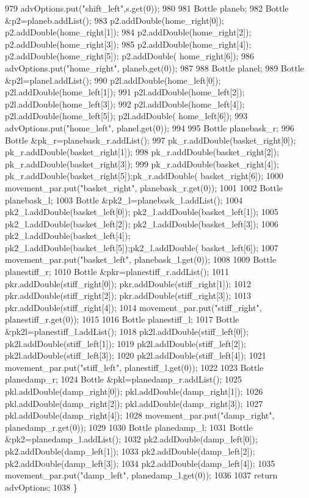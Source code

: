 \begin{DoxyCode}
979     advOptions.put(\textcolor{stringliteral}{"shift\_left"},s.get(0));
980 
981     Bottle planeb;
982     Bottle &p2=planeb.addList();
983     p2.addDouble(home_right[0]); p2.addDouble(home_right[1]);
984     p2.addDouble(home_right[2]); p2.addDouble(home_right[3]);
985     p2.addDouble(home_right[4]); p2.addDouble(home_right[5]); p2.addDouble(
      home_right[6]);
986     advOptions.put(\textcolor{stringliteral}{"home\_right"}, planeb.get(0));
987 
988     Bottle planel;
989     Bottle &p2l=planel.addList();
990     p2l.addDouble(home_left[0]); p2l.addDouble(home_left[1]);
991     p2l.addDouble(home_left[2]); p2l.addDouble(home_left[3]);
992     p2l.addDouble(home_left[4]); p2l.addDouble(home_left[5]); p2l.addDouble(
      home_left[6]);
993     advOptions.put(\textcolor{stringliteral}{"home\_left"}, planel.get(0));
994 
995     Bottle planebask\_r;
996     Bottle &pk\_r=planebask\_r.addList();
997     pk\_r.addDouble(basket_right[0]); pk\_r.addDouble(basket_right[1]);
998     pk\_r.addDouble(basket_right[2]); pk\_r.addDouble(basket_right[3]);
999     pk\_r.addDouble(basket_right[4]); pk\_r.addDouble(basket_right[5]);pk\_r.addDouble(
      basket_right[6]);
1000     movement_par.put(\textcolor{stringliteral}{"basket\_right"}, planebask\_r.get(0));
1001 
1002     Bottle planebask\_l;
1003     Bottle &pk2\_l=planebask\_l.addList();
1004     pk2\_l.addDouble(basket_left[0]); pk2\_l.addDouble(basket_left[1]);
1005     pk2\_l.addDouble(basket_left[2]); pk2\_l.addDouble(basket_left[3]);
1006     pk2\_l.addDouble(basket_left[4]); pk2\_l.addDouble(basket_left[5]);pk2\_l.addDouble(
      basket_left[6]);
1007     movement_par.put(\textcolor{stringliteral}{"basket\_left"}, planebask\_l.get(0));
1008 
1009     Bottle planestiff\_r;
1010     Bottle &pkr=planestiff\_r.addList();
1011     pkr.addDouble(stiff_right[0]); pkr.addDouble(stiff_right[1]);
1012     pkr.addDouble(stiff_right[2]); pkr.addDouble(stiff_right[3]);
1013     pkr.addDouble(stiff_right[4]);
1014     movement_par.put(\textcolor{stringliteral}{"stiff\_right"}, planestiff\_r.get(0));
1015 
1016     Bottle planestiff\_l;
1017     Bottle &pk2l=planestiff\_l.addList();
1018     pk2l.addDouble(stiff_left[0]); pk2l.addDouble(stiff_left[1]);
1019     pk2l.addDouble(stiff_left[2]); pk2l.addDouble(stiff_left[3]);
1020     pk2l.addDouble(stiff_left[4]);
1021     movement_par.put(\textcolor{stringliteral}{"stiff\_left"}, planestiff\_l.get(0));
1022 
1023     Bottle planedamp\_r;
1024     Bottle &pkl=planedamp\_r.addList();
1025     pkl.addDouble(damp_right[0]); pkl.addDouble(damp_right[1]);
1026     pkl.addDouble(damp_right[2]); pkl.addDouble(damp_right[3]);
1027     pkl.addDouble(damp_right[4]);
1028     movement_par.put(\textcolor{stringliteral}{"damp\_right"}, planedamp\_r.get(0));
1029 
1030     Bottle planedamp\_l;
1031     Bottle &pk2=planedamp\_l.addList();
1032     pk2.addDouble(damp_left[0]); pk2.addDouble(damp_left[1]);
1033     pk2.addDouble(damp_left[2]); pk2.addDouble(damp_left[3]);
1034     pk2.addDouble(damp_left[4]);
1035     movement_par.put(\textcolor{stringliteral}{"damp\_left"}, planedamp\_l.get(0));
1036 
1037     \textcolor{keywordflow}{return} advOptions;
1038 \}
\end{DoxyCode}
